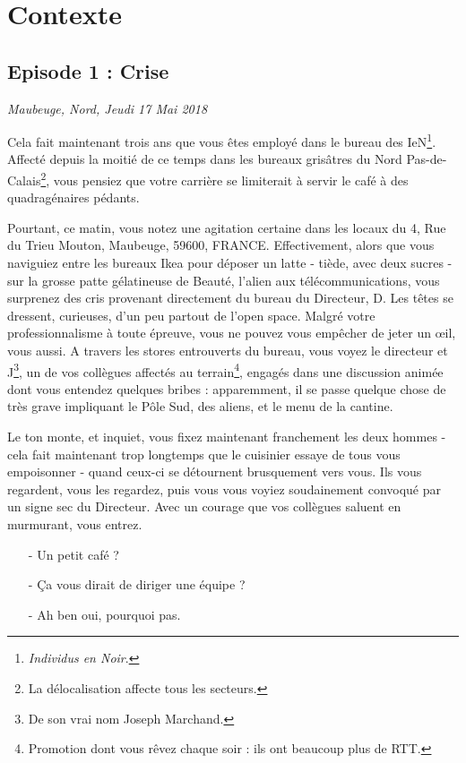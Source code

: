 \newpage

\section{Contexte}
\subsection{Episode 1 : Crise}
\hfill \textit{Maubeuge, Nord, Jeudi 17 Mai 2018}

Cela fait maintenant trois ans que vous êtes employé dans le bureau des
IeN\footnote{\emph{Individus en Noir}\texttrademark.}.  Affecté depuis la moitié
de ce temps dans les bureaux grisâtres du Nord Pas-de-Calais\footnote{La
délocalisation affecte tous les secteurs.}, vous pensiez que votre carrière se
limiterait à servir le café à des quadragénaires pédants. 

Pourtant, ce matin, vous notez une agitation certaine dans les locaux du 4, Rue
du Trieu Mouton, Maubeuge, 59600, FRANCE.
Effectivement, alors que vous naviguiez entre les bureaux Ikea
pour déposer un latte - tiède, avec deux sucres - sur la grosse patte
gélatineuse de Beauté, l'alien aux télécommunications, vous surprenez des cris
provenant directement du bureau du Directeur, D. Les têtes se dressent,
curieuses, d'un peu partout de l'open space. Malgré votre professionnalisme à
toute épreuve, vous ne pouvez vous empêcher de jeter un œil, vous aussi. A
travers les stores entrouverts du bureau, vous voyez le directeur et
J\footnote{De son vrai nom Joseph Marchand.}, un de vos collègues affectés au
terrain\footnote{Promotion dont vous rêvez chaque soir : ils ont beaucoup plus
de RTT.}, engagés dans une discussion animée dont vous entendez quelques bribes
: apparemment, il se passe quelque chose de très grave impliquant le Pôle Sud,
des aliens, et le menu de la cantine.

Le ton monte, et inquiet, vous fixez maintenant franchement les deux hommes -
cela fait maintenant trop longtemps que le cuisinier essaye de tous vous
empoisonner - quand ceux-ci se détournent brusquement vers vous. Ils vous
regardent, vous les regardez, puis vous vous voyiez soudainement convoqué par un
signe sec du Directeur. Avec un courage que vos collègues saluent en murmurant,
vous entrez.

\begin{itemize}
\item[-] Un petit café ?
\item[-] Ça vous dirait de diriger une équipe ?
\item[-] Ah ben oui, pourquoi pas.
\end{itemize}

